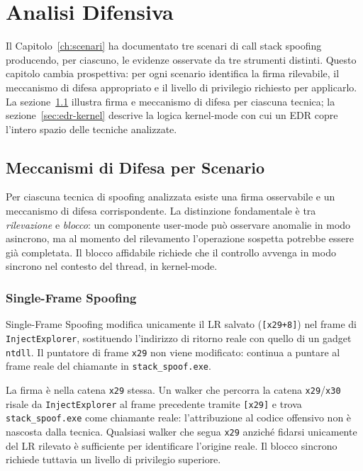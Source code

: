 \chapter{Analisi Difensiva}
\label{ch:difensiva}

Il Capitolo~\ref{ch:scenari} ha documentato tre scenari di call stack spoofing
producendo, per ciascuno, le evidenze osservate da tre strumenti distinti.
Questo capitolo cambia prospettiva: per ogni scenario identifica la firma rilevabile,
il meccanismo di difesa appropriato e il livello di privilegio richiesto per applicarlo.
La sezione~\ref{sec:mapping} illustra firma e meccanismo di difesa per ciascuna tecnica;
la sezione~\ref{sec:edr-kernel} descrive la logica kernel-mode con cui un EDR
copre l'intero spazio delle tecniche analizzate.


\section{Meccanismi di Difesa per Scenario}
\label{sec:mapping}

Per ciascuna tecnica di spoofing analizzata esiste una firma osservabile e un
meccanismo di difesa corrispondente. La distinzione fondamentale è tra
\emph{rilevazione} e \emph{blocco}: un componente user-mode può osservare
anomalie in modo asincrono, ma al momento del rilevamento l'operazione
sospetta potrebbe essere già completata. Il blocco affidabile richiede che il
controllo avvenga in modo sincrono nel contesto del thread, in kernel-mode.

\subsection{Single-Frame Spoofing}

Single-Frame Spoofing modifica unicamente il LR salvato (\texttt{[x29+8]})
nel frame di \texttt{InjectExplorer}, sostituendo l'indirizzo di ritorno reale
con quello di un gadget \texttt{ntdll}. Il puntatore di frame \texttt{x29}
non viene modificato: continua a puntare al frame reale del chiamante in
\texttt{stack\_spoof.exe}.

La firma è nella catena \texttt{x29} stessa. Un walker che percorra la catena
\texttt{x29}/\texttt{x30} risale da \texttt{InjectExplorer} al frame
precedente tramite \texttt{[x29]} e trova \texttt{stack\_spoof.exe} come
chiamante reale: l'attribuzione al codice offensivo non è nascosta dalla
tecnica. Qualsiasi walker che segua \texttt{x29} anziché fidarsi unicamente
del LR rilevato è sufficiente per identificare l'origine reale. Il blocco
sincrono richiede tuttavia un livello di privilegio superiore.

